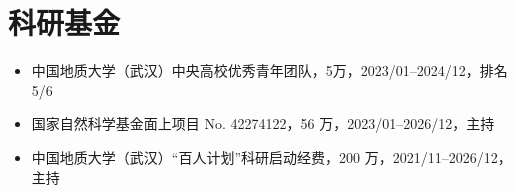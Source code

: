 \section{科研基金}

\begin{itemize}
\item 中国地质大学（武汉）中央高校优秀青年团队，5万，2023/01--2024/12，排名 5/6
\item 国家自然科学基金面上项目 No. 42274122，56 万，2023/01--2026/12，主持
\item 中国地质大学（武汉）“百人计划”科研启动经费，200 万，2021/11--2026/12，主持
\end{itemize}

